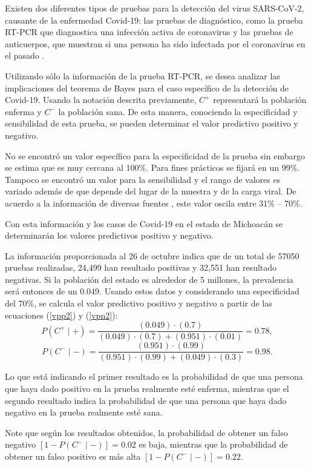 \documentclass[12pt]{article}
\begin{document}
	Existen dos diferentes tipos de pruebas para la detección del virus SARS-CoV-2, causante de la enfermedad Covid-19: las pruebas de diagnóstico, como la prueba RT-PCR que diagnostica una infección activa de coronavirus y las pruebas de anticuerpos, que muestran si una persona ha sido infectada por el coronavirus en el pasado \cite{fda}.
	
	Utilizando sólo la información de la prueba RT-PCR, se desea analizar las implicaciones del teorema de Bayes para el caso específico de la detección de Covid-19. Usando la notación descrita previamente, $C^+$ representará la población enferma y $C^-$ la población sana. De esta manera, conociendo la especificidad y sensibilidad de esta prueba, se pueden determinar el valor predictivo positivo y negativo.
	
	No se encontró un valor específico para la especificidad de la prueba sin embargo se estima que es muy cercana al 100\%. Para fines prácticos se fijará en un 99\%. Tampoco se encontró un valor para la sensibilidad y el rango de valores es variado además de que depende del lugar de la muestra y de la carga viral. De acuerdo a la información de diversas fuentes \cite{chan2020, good2020}, este valor oscila entre 31\% -- 70\%. 
	
	Con esta información y los casos de Covid-19 en el estado de Michoacán \cite{michoacan} se determinarán los valores predictivos positivo y negativo.
	
	La información proporcionada al 26 de octubre indica que de un total de 57050 pruebas realizadas, 24,499 han resultado positivas y 32,551 han resultado negativas. Si la población del estado es alrededor de 5 millones, la prevalencia será entonces de un 0.049. Usando estos datos y considerando una especificidad del 70\%, se calcula el valor predictivo positivo y negativo a partir de las ecuaciones (\ref{vpp2}) y (\ref{vpn2}): 
	\begin{equation*}
	P(C^+ \mid +) = \frac{(0.049) \cdot (0.7)}{(0.049) \cdot (0.7) + (0.951)\cdot(0.01)} = 0.78, 
	\end{equation*}
	\begin{equation*}
	P(C^- \mid -) = \frac{(0.951) \cdot (0.99)}{(0.951) \cdot (0.99) + (0.049) \cdot  (0.3)} = 0.98. 
	\end{equation*} 
	
	Lo que está indicando el primer resultado es la probabilidad de que una persona que haya dado positivo en la prueba realmente esté enferma, mientras que el segundo resultado indica la probabilidad de que una persona que haya dado negativo en la prueba realmente esté sana.
	
	Note que según los resultados obtenidos, la probabilidad de obtener un falso negativo $[1-P(C^- \mid -)] = 0.02$ es baja, mientras que la probabilidad de obtener un falso positivo es más alta $[1-P(C^- \mid -)] = 0.22$.


\end{document}
